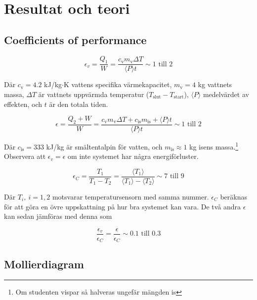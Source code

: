 \documentclass[11pt]{article}
\begin{document}
\section{Resultat och teori}

\subsection{Coefficients of performance}

\begin{equation}
    \epsilon_v = \frac{Q_1}{W} = \frac{c_{\text{v}} m_{\text{v}} \Delta T}{\langle P \rangle t} \sim 1 \text{ till } 2
\end{equation}

Där $c_{\text{v}} = 4.2$ kJ/kg$\cdot$K vattens specifika värmekapacitet, $m_{\text{v}} = 4$ kg vattnets massa, $\Delta T$ är vattnets uppvärmda temperatur ($T_{\text{slut}} -T_{\text{start}}$), $\langle P \rangle$ medelvärdet av effekten, och $t$ är den totala tiden.

\begin{equation}
    \epsilon = \frac{Q_2 + W}{W} = \frac{c_{\text{v}} m_{\text{v}} \Delta T + c_{\text{is}} m_{\text{is}} + \langle P \rangle t}{\langle P \rangle t} \sim 1 \text{ till } 2
\end{equation}

Där $c_{\text{is}} = 333$ kJ/kg är smältentalpin för vatten, och $m_{\text{is}} \approx 1$ kg isens massa.\footnote{Om studenten vispar så halveras ungefär mängden is} Observera att $\epsilon_v = \epsilon$ om inte systemet har några energiförluster.

\begin{equation}
    \epsilon_C = \frac{T_1}{T_1 - T_2} = \frac{\langle T_1 \rangle}{\langle T_1 \rangle - \langle T_2 \rangle} \sim 7 \text{ till } 9
\end{equation}

Där $T_i, \ i = 1, 2$ motsvarar temperatursensorn med samma nummer. $\epsilon_C$ beräknas för att göra en övre uppskattning på hur bra systemet kan vara. De två andra $\epsilon$ kan sedan jämföras med denna som

\begin{equation}
    \frac{\epsilon_v}{\epsilon_C} = \frac{\epsilon}{\epsilon_C} \sim 0.1 \text{ till } 0.3
\end{equation}

\subsection{Mollierdiagram}
\end{document}
